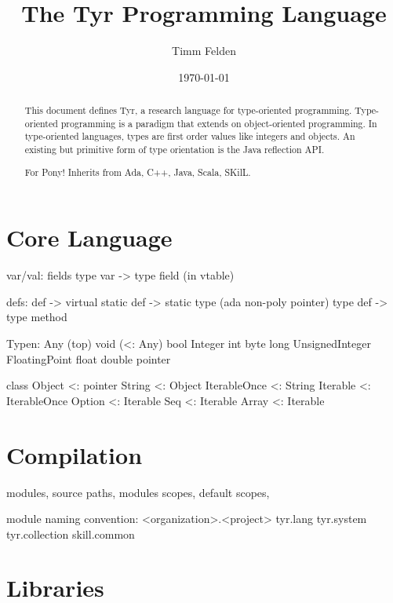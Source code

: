 \documentclass[a4paper,10pt]{article}
\title{The Tyr Programming Language}
\author{Timm Felden}
\date{\today}
\begin{document}
\maketitle

\begin{abstract}
This document defines Tyr, a research language for type-oriented programming.
Type-oriented programming is a paradigm that extends on object-oriented programming.
In type-oriented languages, types are first order values like integers and objects.
An existing but primitive form of type orientation is the Java reflection API.
\end{abstract}

\renewcommand{\abstractname}{Acknowledgements}
\begin{abstract}
For Pony!
Inherits from Ada, C++, Java, Scala, SKilL.
\end{abstract}

\tableofcontents

\newpage
\part{Core Language}
\label{part:spec}







var/val:
  fields
  type var -> type field (in vtable)

defs:
 def -> virtual
 static def -> static type (ada non-poly pointer)
 type def -> type method


Typen:
 Any (top)
 void (<: Any)
 bool
 Integer
 int
 byte
 long
 UnsignedInteger
 FloatingPoint
 float
 double
 pointer
 
class Object <: pointer
  String <: Object
  IterableOnce <: String
  Iterable <: IterableOnce
  Option <: Iterable
  Seq <: Iterable
  Array <: Iterable


\part{Compilation}




modules,
source paths,
modules scopes,
default scopes,


module naming convention:
<organization>.<project>
tyr.lang
tyr.system
tyr.collection
skill.common


\part{Libraries}
\end{document}
